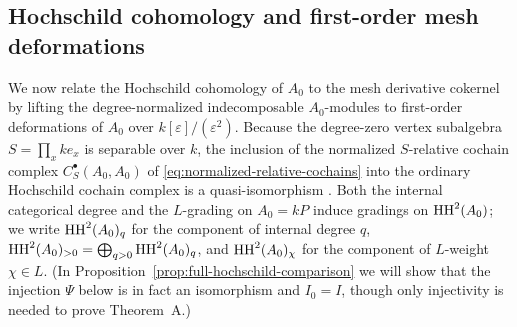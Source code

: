 \subsection{Hochschild cohomology and first-order mesh deformations}
\label{subsec:hochschild-restriction}

We now relate the Hochschild cohomology of $A_0$ to the mesh derivative
cokernel by lifting the degree-normalized indecomposable $A_0$-modules to
first-order deformations of $A_0$ over $k[\varepsilon]/(\varepsilon^2)$.
Because the degree-zero vertex subalgebra $S=\prod_x ke_x$ is separable over
$k$, the inclusion of the normalized $S$-relative cochain complex
$C^\bullet_S(A_0,A_0)$ of \eqref{eq:normalized-relative-cochains} into the
ordinary Hochschild cochain complex is a quasi-isomorphism
\cite[Theorem~1.2]{GerstenhaberSchack}. Both the internal categorical degree
and the $L$-grading on $A_0=kP$ induce gradings on $\operatorname{HH}^2(A_0)$; we write
$\operatorname{HH}^2(A_0)_q$ for the component of internal degree $q$,
$\operatorname{HH}^2(A_0)_{>0}=\bigoplus_{q>0}\operatorname{HH}^2(A_0)_q$, and $\operatorname{HH}^2(A_0)_\chi$ for the
component of $L$-weight $\chi\in L$. (In
Proposition~\ref{prop:full-hochschild-comparison} we will show that the
injection $\Psi$ below is in fact an isomorphism and $I_0=I$, though only
injectivity is needed to prove Theorem~A.)


